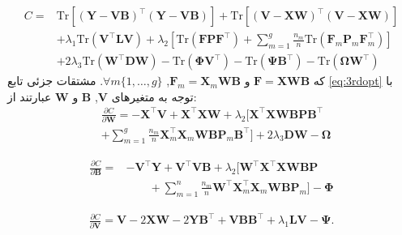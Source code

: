 \begin{align}\label{eq:3rdopt}
	C =  &\mathrm{Tr}[(\bm{Y} - \bm{V}\bm{B})^\top (\bm{Y} - \bm{V}\bm{B})]+ \mathrm{Tr}[(\bm{V}-\bm{X}\bm{W})^\top(\bm{V} - \bm{X}\bm{W})]\nonumber\\
	&+\lambda_1\mathrm{Tr}(\bm{V}^\top \bm{LV})+\lambda_2[\mathrm{Tr}(\bm{F}\bm{P}\bm{F}^\top)+ \sum_{m=1}^{g}\frac{n_m}{n}\mathrm{Tr}(\bm{F}_m\bm{P}_m\bm{F}_m^\top)]\nonumber\\
	&+ 2 \lambda_3\mathrm{Tr}(\bm{W}^\top \bm{D}\bm{W})- \mathrm{Tr}(\bm{\Phi}\bm{V}^\top) -\mathrm{Tr}(\bm{\Psi}\bm{B}^\top) -\mathrm{Tr}(\bm{\Omega}\bm{W}^\top)
\end{align}
که $\bm{F}=\bm{XWB}$ و $‎\bm{F}_m=\bm{X}_m\bm{WB}‎$, $\forall m \{1,{\dots},{g}\}$. مشتقات جزئی تابع \eqref{eq:3rdopt} با توجه به متغیرهای $‎\bm{V}$, $ \bm{B}$ و $\bm{W}$ عبارتند از:
\begin{align}\label{eq:derW}
	&\frac{\partial C}{\partial\bm{W}} = {-\bm{X}^\top \bm{V} + \bm{X}^\top \bm{XW} + \lambda_2[\bm{X}^\top \bm{XWBPB}^\top}\nonumber\\
	&+ \sum_{m=1}^{g}\frac{n_m}{n} \bm{X}^\top_m \bm{X}_m\bm{WBP}_m\bm{B}^\top]+ 2\lambda_3\bm{DW}-\bm{\Omega}
\end{align}

\begin{align}\label{eq:derB}
	\frac{\partial C}{\partial \bm{B}} = &{-\bm{V}^\top \bm{Y} + \bm{V}^\top \bm{VB} + \lambda_2[\bm{W}^\top \bm{X}^\top \bm{XWBP}} \nonumber \\
	& \quad\quad+ \sum_{m=1}^{n} \frac{n_m}{n}\bm{W}^\top \bm{X}^\top_m \bm{X}_m\bm{WBP}_m] - \bm{\Phi}
\end{align}	

\begin{align}\label{eq:derV}
	\frac{\partial C}{\partial \bm{V}} = {\bm{V} - 2\bm{XW} - 2\bm{YB}^\top + \bm{VBB}^\top + \lambda_1\bm{LV} -\bm{\Psi}}.
\end{align}

